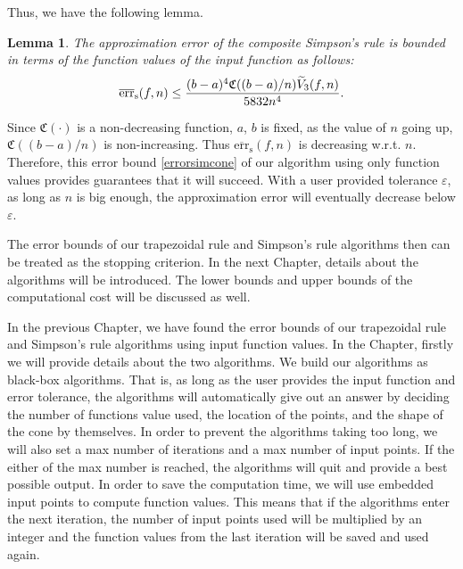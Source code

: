 \documentclass{iitthesis}
\DeclareMathOperator{\Var}{Var}
\newtheorem{lem}{Lemma}
\theoremstyle{definition}
\theoremstyle{remark}
\begin{document}
Thus, we have the following lemma.
\begin{lem}\label{lemmaerrorboundsim}
    The approximation error of the composite Simpson's rule is bounded in terms of the function values of the input function as follows:
    \begin{equation}\label{errorsimcone}
      \overline{\textup{err}}_{\text{s}}(f,n)\leq \frac{(b-a)^4\mathfrak{C}((b-a)/n)\widetilde{V}_3(f,n)}{5832n^4}.
    \end{equation}
\end{lem}


Since $\mathfrak{C}(\cdot)$ is a non-decreasing function, $a$, $b$ is fixed, as the value of $n$ going up, $\mathfrak{C}((b-a)/n)$ is non-increasing. Thus $\overline{\text{err}}_{\text{s}}(f,n)$ is decreasing w.r.t. $n$. Therefore, this error bound \eqref{errorsimcone} of our algorithm using only function values provides guarantees that it will succeed. With a user provided tolerance $\varepsilon$, as long as $n$ is big enough, the approximation error will eventually decrease below $\varepsilon$.

The error bounds of our trapezoidal rule and Simpson's rule algorithms then can be treated as the stopping criterion. In the next Chapter, details about the algorithms will be introduced. The lower bounds and upper bounds of the computational cost will be discussed as well.

%






In the previous Chapter, we have found the error bounds of our trapezoidal rule and Simpson's rule algorithms using input function values. In the Chapter, firstly we will provide details about the two algorithms. We build our algorithms as black-box algorithms. That is, as long as the user provides the input function and error tolerance, the algorithms will automatically give out an answer by deciding the number of functions value used, the location of the points, and the shape of the cone by themselves. In order to prevent the algorithms taking too long, we will also set a max number of iterations and a max number of input points. If the either of the max number is reached, the algorithms will quit and provide a best possible output. In order to save the computation time, we will use embedded input points to compute function values. This means that if the algorithms enter the next iteration, the number of input points used will be multiplied by an integer and the function values from the last iteration will be saved and used again.
\end{document}
